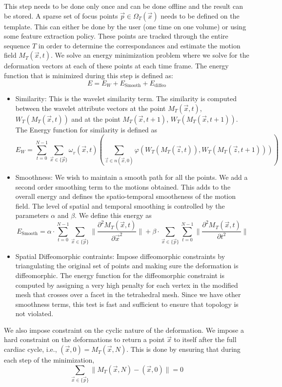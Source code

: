 \documentclass{article}
\newcommand{\tmop}[1]{\operatorname{#1}}
\newenvironment{itemizearrow}
  {\begin{itemize}\renewcommand{\labelitemi}{$\rightarrow$}\renewcommand{\labelitemii}{$\rightarrow$}\renewcommand{\labelitemiii}{$\rightarrow$}\renewcommand{\labelitemiv}{$\rightarrow$}}{\end{itemize}}
\begin{document}
This step needs to be done only once and can be done offline and the result
can be stored. A sparse set of focus points $\vec{p} \in \Omega_T ( \vec{x} )$
needs to be defined on the template. This can either be done by the user (one
time on one volume) or using some feature extraction policy. These points are
tracked through the entire sequence $T$ in order to determine the
correspondances and estimate the motion field $M_T ( \vec{x}, t )$. We solve
an energy minimization problem where we solve for the deformation vectors at
each of these points at each time frame. The energy function that is minimized
during this step is defined as:
\[ E = E_W + E_{\tmop{Smooth}} + E_{\tmop{diffeo}} \]
\begin{itemizearrow}
  \item Similarity: This is the wavelet similarity term. The similarity is
  computed between the wavelet attribute vectors at the point $M_T ( \vec{x},
  t )$, $W_T \text{$( M_T ( \vec{x}, t ) )$}$ and at the point $M_T ( \vec{x},
  t + 1 )$, $W_T ( M_T ( \vec{x}, t + 1 ) )$. The Energy function for
  similarity is defined as
  \[ E_W = \sum_{t = 0}^{N - 1} \sum_{\vec{x} \in \{ \vec{p} \}} \omega_{}_T (
     \vec{x}, t ) \left( \sum_{\vec{z} \in n ( \vec{x}, 0 )} \varphi \left(
     W_T ( M_T ( \vec{z}, t ) ), W_T ( M_T ( \vec{z}, t + 1 ) ) \right)
     \right) \]
  \item Smoothness: We wish to maintain a smooth path for all the points. We
  add a second order smoothing term to the motions obtained. This adds to the
  overall energy and defines the spatio-temporal smootheness of the motion
  field. The level of spatial and temporal smoothing is controlled by the
  parameters $\alpha$ and $\beta$. We define this energy as
  \[ E_{\tmop{Smooth}} = \alpha \cdot \sum_{t = 0}^{N - 1} \sum_{\vec{x} \in
     \{ \vec{p} \}} \| \frac{\partial^2 M_{_{} T} ( \vec{x}, t )}{\partial
     \vec{x}^2} \| + \beta \cdot \sum_{\vec{x} \in \{ \vec{p} \}} \sum_{t =
     0}^{N - 1} \| \frac{\partial^2 M_{_{} T} ( \vec{x}, t )}{\partial t^2} \|
  \]
  \item Spatial Diffeomorphic contraints: Impose diffeomorphic constraints by
  triangulating the original set of points and making sure the deformation is
  diffeomorphic. The energy function for the diffeomorphic constraint is
  computed by assigning a very high penalty for each vertex in the modified
  mesh that crosses over a facet in the tetrahedral mesh. Since we have other
  smoothness terms, this test is fast and sufficient to ensure that topology
  is not violated.
\end{itemizearrow}
We also impose constraint on the cyclic nature of the deformation. We impose a
hard constraint on the deformations to return a point $\vec{x}$ to itself
after the full cardiac cycle, i.e., $( \vec{x}, 0 ) = M_T ( \vec{x}, N )$.
This is done by ensuring that during each step of the minimization,
\[ \text{$\sum_{\vec{x} \in \{ \vec{p} \}} \| M_T ( \vec{x}, N ) - ( \vec{x},
   0 ) \| = 0$} \]
\end{document}

